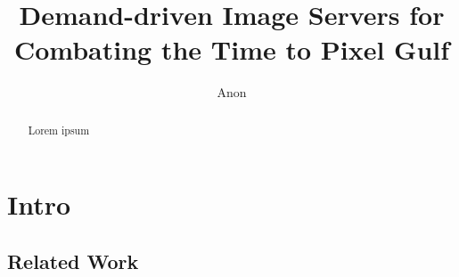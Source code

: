 \documentclass{llncs}
\begin{document}
%
\title{Demand-driven Image Servers for Combating the Time to Pixel Gulf}
%
%
\author{Anon}
%
%
%

\maketitle              %

\begin{abstract}
Lorem ipsum
\end{abstract}
%
\section{Intro}
%
%
\subsection{Related Work}
%

%
%
\begin{thebibliography}{}

\end{thebibliography}
\end{document}
